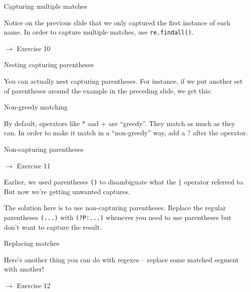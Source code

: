 \documentclass{beamer}
\begin{document}
\begin{frame}{Capturing multiple matches}

Notice on the previous slide that we only captured the first instance of each name.
In order to capture multiple matches, use \lstinline$re.findall()$.



$\rightarrow$ Exercise 10

\end{frame}

\begin{frame}{Nesting capturing parentheses}

You can actually nest capturing parentheses. For instance, if we put
another set of parentheses around the example in the preceding slide, 
we get this:

\bigskip



\end{frame}


\begin{frame}{Non-greedy matching}

By default, operators like * and + are ``greedy''. They match as much
as they can. In order to make it match in a ``non-greedy'' way, add a ?
after the operator.



\end{frame}

\begin{frame}{Non-capturing parentheses}

$\rightarrow$ Exercise 11

\bigskip

Earlier, we used parentheses  \lstinline$()$ to disambiguate what the \lstinline$|$ operator
referred to. But now we're getting unwanted captures.

\bigskip

The solution here is to use non-capturing parentheses. Replace the regular 
parentheses  \lstinline$(...)$ with  \lstinline$(?P:...)$ whenever you
need to use parentheses but don't want to capture the result.

\end{frame}

\begin{frame}{Replacing matches}

Here's another thing you can do with regexes -- replace some matched segment
with another! %


\bigskip

$\rightarrow$ Exercise 12

\end{frame}
\end{document}

